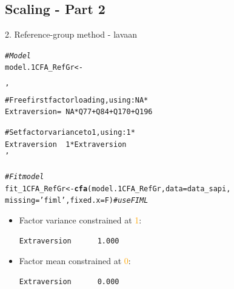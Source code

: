 \documentclass[10pt]{beamer}\usepackage[]{graphicx}\usepackage[]{xcolor}
\makeatletter
\newcommand{\hlstr}[1]{\textcolor[rgb]{0.192,0.494,0.8}{#1}}%
\newcommand{\hlcom}[1]{\textcolor[rgb]{0.678,0.584,0.686}{\textit{#1}}}%
\newcommand{\hlstd}[1]{\textcolor[rgb]{0.345,0.345,0.345}{#1}}%
\newcommand{\hlkwb}[1]{\textcolor[rgb]{0.69,0.353,0.396}{#1}}%
\newcommand{\hlkwc}[1]{\textcolor[rgb]{0.333,0.667,0.333}{#1}}%
\newcommand{\hlkwd}[1]{\textcolor[rgb]{0.737,0.353,0.396}{\textbf{#1}}}%
\newenvironment{kframe}{%
 \def\at@end@of@kframe{}%
 \ifinner\ifhmode%
  \def\at@end@of@kframe{\end{minipage}}%
  \begin{minipage}{\columnwidth}%
 \fi\fi%
 \def\FrameCommand##1{\hskip\@totalleftmargin \hskip-\fboxsep
 \colorbox{shadecolor}{##1}\hskip-\fboxsep
     \hskip-\linewidth \hskip-\@totalleftmargin \hskip\columnwidth}%
 \MakeFramed {\advance\hsize-\width
   \@totalleftmargin\z@ \linewidth\hsize
   \@setminipage}}%
 {\par\unskip\endMakeFramed%
 \at@end@of@kframe}
\newenvironment{knitrout}{}{} %
\makeatother
\begin{document}
\subsection*{Scaling - Part 2}
%
\begin{frame}[fragile]{2. Reference-group method - lavaan}

\begin{knitrout}
\color{fgcolor}\begin{kframe}
\begin{alltt}
\hlcom{# Model}
\hlstd{model.1CFA_RefGr} \hlkwb{<-} \hlstr{'
  # Free first factor loading, using: NA*
  Extraversion =~ NA*Q77 + Q84 + Q170 + Q196
  
  # Set factor variance to 1, using: 1*
  Extraversion ~~ 1*Extraversion
 '}

\hlcom{# Fit model}
\hlstd{fit_1CFA_RefGr} \hlkwb{<-} \hlkwd{cfa}\hlstd{(model.1CFA_RefGr,} \hlkwc{data}\hlstd{=data_sapi,}
                \hlkwc{missing}\hlstd{=}\hlstr{'fiml'}\hlstd{,} \hlkwc{fixed.x}\hlstd{=F)}  \hlcom{# use FIML}
\end{alltt}
\end{kframe}
\end{knitrout}

\begin{itemize}
    \item Factor variance constrained at \textcolor{orange}{1}:\\
\begin{verbatim}
Extraversion      1.000
\end{verbatim}
    \item Factor mean constrained at \textcolor{orange}{0}:\\
\begin{verbatim}
Extraversion      0.000
\end{verbatim}
\end{itemize} 

\end{frame}
%
\end{document}
